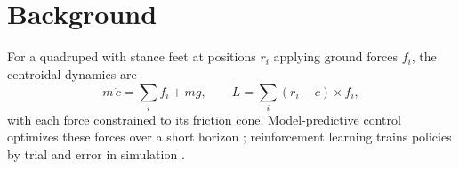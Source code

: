 \chapter{Background}
\label{ch:background}

For a quadruped with stance feet at positions $r_i$ applying ground forces $f_i$, the centroidal
dynamics are
\begin{equation}
  m\,\ddot{c} = \sum_i f_i + m g, \qquad \dot{L} = \sum_i (r_i - c) \times f_i ,
  \label{eq:centroidal}
\end{equation}
with each force constrained to its friction cone. Model-predictive control optimizes these
forces over a short horizon \citep{dicarlo2018}; reinforcement learning trains policies by trial
and error in simulation \citep{schulman2017ppo}.
